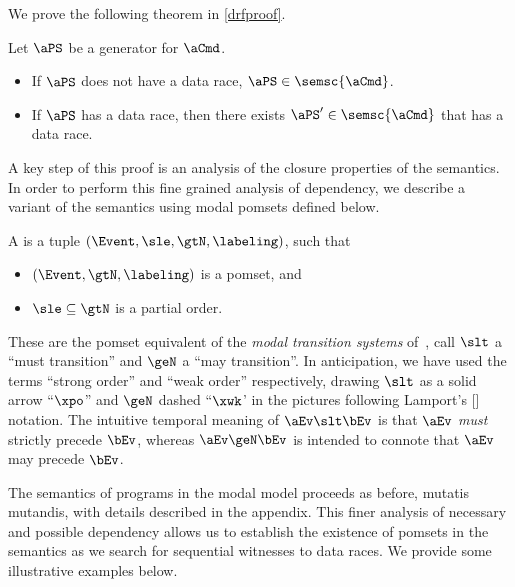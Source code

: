 We prove the following theorem in \textsection\ref{drfproof}.
\begin{theorem}
  Let $\aPS$ be a generator for $\aCmd$.
  \begin{itemize}
  \item If $\aPS$ does not have a data race, $\aPS \in \semsc{\aCmd}$.
  \item If $\aPS$ has a data race, then there exists
    $\aPS'\in \semsc{\aCmd}$ that has a data race.
  \end{itemize}
\end{theorem}
A key step of this proof is an analysis of the closure properties of the semantics.  In order to perform this fine grained analysis of dependency, we describe a variant of the semantics using modal pomsets defined below.  
\begin{definition}
  \label{def:tvalpom}
  A \emph{\tvalpom} is a tuple
  $(\Event, {\sle}, {\gtN},
  \labeling)$, such that
  \begin{itemize}
   \item $(\Event, {\gtN},
  \labeling)$ is a pomset, and 
\item ${\sle} \subseteq {\gtN}$ is a partial order. 
  \end{itemize}
\end{definition}
These are the pomset equivalent of the \emph{modal transition systems} of~\citet{DBLP:conf/lics/LarsenT88},
\citet{DBLP:conf/esop/HuthJS01} call $\slt$ a ``must transition''
and $\geN$ a ``may transition''.  In anticipation, we have used  the terms ``strong order'' and ``weak order'' respectively, drawing $\slt$ as a solid arrow ``$\xpo$'' and $\geN$ dashed ``$\xwk$' in the pictures following Lamport's [\citeyear{DBLP:journals/dc/Lamport86}] notation.  The intuitive temporal meaning of $ \aEv \slt \bEv$ is that $\aEv$ {\em must} strictly precede $\bEv$, whereas $ \aEv \geN \bEv$ is intended to connote that $\aEv$ may precede $\bEv$.
 
The semantics of programs in the modal model proceeds as before, mutatis mutandis, with details described in the appendix.  This finer analysis of necessary and possible dependency allows us to establish the existence of pomsets in the semantics as we search for sequential witnesses to data races.    We provide some illustrative examples below.


